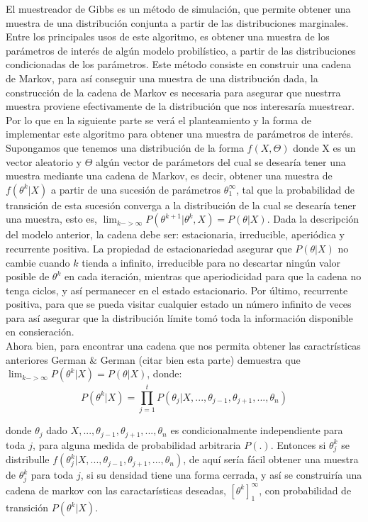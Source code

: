 \documentclass[11pt]{book}
\begin{document}
El muestreador de Gibbs es un método de simulación, que permite obtener una muestra de una distribución conjunta a partir de las distribuciones marginales. Entre los principales usos de este algoritmo, es obtener una muestra de los parámetros de interés de algún modelo probilístico, a partir de las distribuciones condicionadas de los parámetros. Este método consiste en construir una cadena de Markov, para así conseguir una muestra de una distribución dada, la construcción de la cadena de Markov es necesaria para asegurar que nuestrra muestra proviene efectivamente de la distribución que nos interesaría muestrear. Por lo que en la siguiente parte se verá el planteamiento y la forma de implementar este algoritmo para obtener una muestra de parámetros de interés. \\

Supongamos que tenemos una distribución de la forma $f(X,\Theta)$ donde X es un vector aleatorio y $\Theta$ algún vector de parámetors del cual se desearía tener una muestra mediante una cadena de Markov, es decir, obtener una muestra de $f(\theta ^{k}|X)$ a partir de una sucesión de parámetros ${\theta}_{1} ^{\infty}$, tal que la probabilidad de transición de esta sucesión converga a la distribución de la cual se desearía tener una muestra, esto es, $\lim_{k->\infty} P(\theta^{k+1}|\theta^{k},X)=P(\theta|X)$. Dada la descripción del modelo anterior, la cadena debe ser: estacionaria, irreducible, aperiódica y recurrente positiva. La propiedad de estacionariedad asegurar que $P(\theta|X)$ no cambie cuando $k$ tienda a infinito, irreducible para no descartar ningún valor posible de $\theta ^{k}$ en cada iteración, mientras que aperiodicidad para que la cadena no tenga ciclos, y así permanecer en el estado estacionario. Por último, recurrente positiva, para que se pueda visitar cualquier estado un número infinito de veces para así asegurar que la distribución límite tomó toda la información disponible en consieración.\\

Ahora bien, para encontrar una cadena que nos permita obtener las caractrísticas anteriores German $\&$ German (citar bien esta parte) demuestra que  $ \lim_{k->\infty} P(\theta^{k}|X)=P(\theta|X)$, donde:
\begin{equation*}
 P(\theta^{k}|X)=\stackrel{~}{{\prod}_{j=1}^{t }}P(\theta_{j}|X,...,\theta_{j-1},\theta_{j+1},...,\theta_{n}) 
\end{equation*}

 donde $\theta_{j}$ dado $X,...,\theta_{j-1},\theta_{j+1},...,\theta_{n}$ es condicionalmente independiente para toda $j$, para alguna medida de probabilidad arbitraria $P(.)$. Entonces si $\theta_{j} ^{k}$ se distribulle $ f(\theta_{j} ^{k}|X,...,\theta_{j-1},\theta_{j+1},...,\theta_{n})$, de aquí sería fácil obtener una muestra de $\theta_{j} ^{k}$ para toda $j$, si su densidad tiene una forma cerrada, y así se construiría una cadena de markov con las caractarísticas deseadas, $[\theta^{k}] _{1} ^{\infty}$, con probabilidad de transición $P(\theta^{k}|X)$.\\
\end{document}
